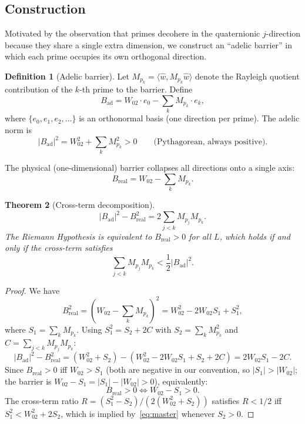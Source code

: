 \documentclass[11pt,a4paper]{article}
\newtheorem{theorem}{Theorem}[section]
\theoremstyle{definition}
\newtheorem{definition}[theorem]{Definition}
\begin{document}
\subsection{Construction}

Motivated by the observation that primes decohere in the quaternionic $j$-direction because they share a single extra dimension, we construct an ``adelic barrier'' in which each prime occupies its own orthogonal direction.

\begin{definition}[Adelic barrier]
Let $M_{p_k} = \langle \hat{w}, M_{p_k} \hat{w} \rangle$ denote the Rayleigh quotient contribution of the $k$-th prime to the barrier. Define
\[
B_{\mathrm{ad}} = W_{02} \cdot e_0 - \sum_k M_{p_k} \cdot e_k,
\]
where $\{e_0, e_1, e_2, \ldots\}$ is an orthonormal basis (one direction per prime). The adelic norm is
\begin{equation}\label{eq:adelic-norm}
|B_{\mathrm{ad}}|^2 = W_{02}^2 + \sum_k M_{p_k}^2 > 0 \qquad \text{(Pythagorean, always positive).}
\end{equation}
\end{definition}

The physical (one-dimensional) barrier collapses all directions onto a single axis:
\[
B_{\mathrm{real}} = W_{02} - \sum_k M_{p_k}.
\]

\begin{theorem}[Cross-term decomposition]\label{thm:cross-term}
\[
|B_{\mathrm{ad}}|^2 - B_{\mathrm{real}}^2 = 2 \sum_{j < k} M_{p_j} M_{p_k}.
\]
The Riemann Hypothesis is equivalent to $B_{\mathrm{real}} > 0$ for all $L$, which holds if and only if the cross-term satisfies
\begin{equation}\label{eq:cross-bound}
\sum_{j < k} M_{p_j} M_{p_k} < \frac{1}{2} |B_{\mathrm{ad}}|^2.
\end{equation}
\end{theorem}

\begin{proof}
We have
\[
B_{\mathrm{real}}^2 = \left(W_{02} - \sum_k M_{p_k}\right)^2 = W_{02}^2 - 2W_{02} S_1 + S_1^2,
\]
where $S_1 = \sum_k M_{p_k}$. Using $S_1^2 = S_2 + 2C$ with $S_2 = \sum_k M_{p_k}^2$ and $C = \sum_{j<k} M_{p_j} M_{p_k}$:
\[
|B_{\mathrm{ad}}|^2 - B_{\mathrm{real}}^2 = (W_{02}^2 + S_2) - (W_{02}^2 - 2W_{02} S_1 + S_2 + 2C) = 2W_{02} S_1 - 2C.
\]
Since $B_{\mathrm{real}} > 0$ iff $W_{02} > S_1$ (both are negative in our convention, so $|S_1| > |W_{02}|$; the barrier is $W_{02} - S_1 = |S_1| - |W_{02}| > 0$), equivalently:
\begin{equation}\label{eq:master}
B_{\mathrm{real}} > 0 \iff W_{02} - S_1 > 0.
\end{equation}
The cross-term ratio $R = (S_1^2 - S_2)/(2(W_{02}^2 + S_2))$ satisfies $R < 1/2$ iff $S_1^2 < W_{02}^2 + 2S_2$, which is implied by~\eqref{eq:master} whenever $S_2 > 0$.
\end{proof}
\end{document}
